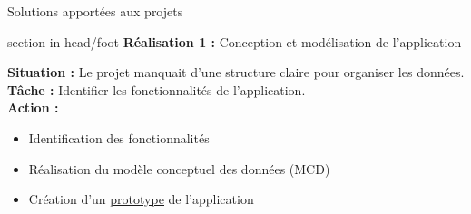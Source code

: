\documentclass{beamer}
\begin{document}
\begin{frame}[label=realisation]{Solutions apportées aux projets}
	\begin{beamercolorbox}[wd=\paperwidth,ht=1.5em,dp=0.5em,leftskip=0.5cm]{section in head/foot}
  		\large \textbf{Réalisation 1 :} \normalsize Conception et modélisation de l'application
	\end{beamercolorbox}
	\vspace{0.5em}

	\begin{center}
  		 {
  			\begin{minipage}{0.9\textwidth}
  				\textbf{Situation :} Le projet manquait d’une structure claire pour organiser les données. \pause \\  		
  				\textbf{Tâche :} Identifier les fonctionnalités de l'application.\pause \\
  				\textbf{Action :}
  			  		\begin{itemize}
  						\item Identification des fonctionnalités
  						\item Réalisation du modèle conceptuel des données (MCD)
  						\item Création d'un \href{https://www.figma.com/design/GuunRMUtzwJjCk1OudcjYl/Pain-Pizza?node-id=0-1&p=f&t=KjBsRt1nqpntIccn-0}{\underline{prototype}} de l'application
  					\end{itemize}
  				\pause
  				

\end{minipage}}
\end{center}
\end{frame}
\end{document}

